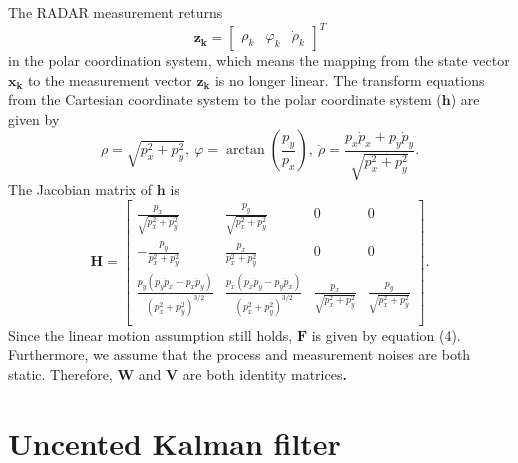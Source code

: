 \documentclass[12pt]{article}
\begin{document}
The RADAR measurement returns
%
\begin{equation}
	{\mathbf{z}_{\mathbf{k}} = \begin{bmatrix} \rho_{k} & \varphi_{k} & 	{\dot{\rho}}_{k} \end{bmatrix}}^{T}
\end{equation}
%
in the polar coordination system, which means the mapping from the state vector \(\mathbf{x}_{\mathbf{k}}\) to the measurement vector \(\mathbf{z}_{\mathbf{k}}\) is no longer linear. The transform equations from the Cartesian coordinate system to the polar coordinate system (\(\mathbf{h}\)) are given by
%
\begin{equation}
	\rho = \sqrt{p_x^{2} + p_y^{2}},\ \varphi = \arctan( \frac{p_y}{p_x}),\ 	\dot{\rho} = \frac{p_x \dot{p}_x + p_y \dot{p}_y}{\sqrt{p_x^{2} + p_y^{2}}}.
\end{equation}
%
The Jacobian matrix of \(\mathbf{h}\) is
%
\begin{equation}
	\renewcommand{\arraystretch}{1.5}
	\mathbf{H} = \begin{bmatrix}
	\frac{p_x}{\sqrt{p_x^{2} + p_y^{2}}} & \frac{p_y}{\sqrt{p_x^{2} + p_y^{2}}} & 0 & 0 \\
	 - \frac{p_y}{p_x^{2} + p_y^{2}} & \frac{p_x}{p_x^{2} + p_y^{2}} & 0 & 0 \\
	\frac{p_y( p_y \dot{p}_x - p_x \dot{p}_y)}{( p_x^{2} + p_y^{2})^{3/2}} & \frac{p_x( p_x \dot{p}_y - p_y \dot{p}_x)}{( p_x^{2} + p_y^{2})^{3/2}} & \frac{p_x}{\sqrt{p_x^{2} + p_y^{2}}} & \frac{p_y}{\sqrt{p_x^{2} + p_y^{2}}} \\
	\end{bmatrix}.
\end{equation}
%
Since the linear motion assumption still holds, \(\mathbf{F}\) is 
given by equation (4). Furthermore, we assume that the process and
measurement noises are both static. Therefore, \(\mathbf{W}\) and
\(\mathbf{V}\) are both identity matrices\textbf{.}


\section{Uncented Kalman filter}\label{uncented-kalman-filter}
\end{document}
